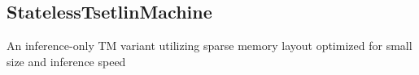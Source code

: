 \documentclass[english]{aghengthesis} %
\begin{document}





\subsection{StatelessTsetlinMachine}
An inference-only TM variant utilizing sparse memory layout optimized for small size and inference speed






\end{document}
